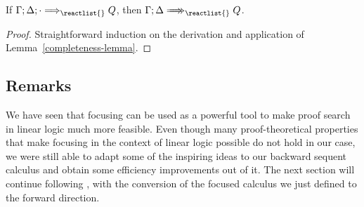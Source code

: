 \begin{theorem}[Completeness]
  If $\ztriseq{\Gamma}{\Delta}{\cdot}{\reactlist{}}{Q}$, then
  $\zbneuseq{\Gamma}{\Delta}{\reactlist{}}{Q}$.
\end{theorem}
\begin{proof}
  Straightforward induction on the derivation and application of
  Lemma~\ref{completeness-lemma}.
\end{proof}

\subsection{Remarks}

We have seen that focusing can be used as a powerful tool to make proof search
in linear logic much more feasible. Even though many proof-theoretical
properties that make focusing in the context of linear logic possible do not
hold in our case, we were still able to adapt some of the inspiring ideas to our
backward sequent calculus and obtain some efficiency improvements out of it.
The next section will continue following \cite{chaudhuri-thesis}, with the
conversion of the focused calculus we just defined to the forward direction.

